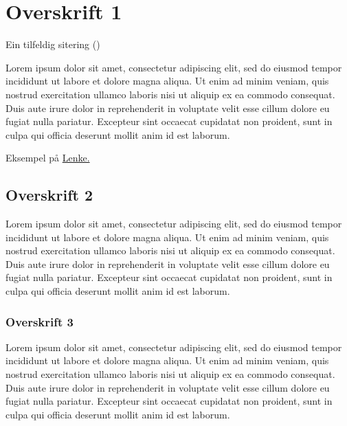 \section{Overskrift 1}
Ein tilfeldig sitering (\cite{lowry1951protein})

Lorem ipsum dolor sit amet, consectetur adipiscing elit, sed do eiusmod tempor 
incididunt ut labore et dolore magna aliqua. Ut enim ad minim veniam, quis 
nostrud exercitation ullamco laboris nisi ut aliquip ex ea commodo consequat. 
Duis aute irure dolor in reprehenderit in voluptate velit esse cillum dolore 
eu fugiat nulla pariatur. Excepteur sint occaecat cupidatat non proident, sunt 
in culpa qui officia deserunt mollit anim id est laborum.

Eksempel på \href{http://www.vestforsk.no}{Lenke.}

\subsection{Overskrift 2}
Lorem ipsum dolor sit amet, consectetur adipiscing elit, sed do eiusmod tempor 
incididunt ut labore et dolore magna aliqua. Ut enim ad minim veniam, quis 
nostrud exercitation ullamco laboris nisi ut aliquip ex ea commodo consequat. 
Duis aute irure dolor in reprehenderit in voluptate velit esse cillum dolore 
eu fugiat nulla pariatur. Excepteur sint occaecat cupidatat non proident, sunt 
in culpa qui officia deserunt mollit anim id est laborum.

\subsubsection{Overskrift 3}
Lorem ipsum dolor sit amet, consectetur adipiscing elit, sed do eiusmod tempor 
incididunt ut labore et dolore magna aliqua. Ut enim ad minim veniam, quis 
nostrud exercitation ullamco laboris nisi ut aliquip ex ea commodo consequat. 
Duis aute irure dolor in reprehenderit in voluptate velit esse cillum dolore 
eu fugiat nulla pariatur. Excepteur sint occaecat cupidatat non proident, sunt 
in culpa qui officia deserunt mollit anim id est laborum.